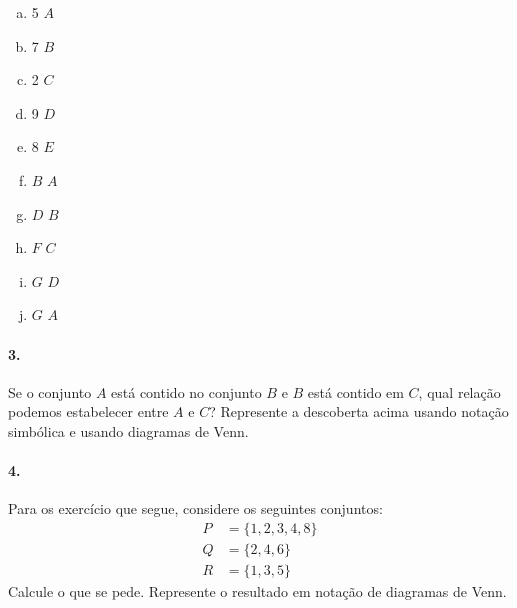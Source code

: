 \documentclass[a4paper,twocolumn,12pt]{article}
\begin{document}
\begin{minipage}[t]{0.4\columnwidth}
  
\begin{enumerate}[a)]
  \item 5 \complete $A$
  \item 7 \complete $B$
  \item 2 \complete $C$
  \item 9 \complete $D$
  \item 8 \complete $E$
  \end{enumerate}
  
\end{minipage}\hfil\begin{minipage}[t]{0.3\columnwidth}

\begin{enumerate}[a)]
  \setcounter{enumi}{5}
  \item $B$ \complete $A$
  \item $D$ \complete $B$
  \item $F$ \complete $C$
  \item $G$ \complete $D$
  \item $G$ \complete $A$
  \end{enumerate}
  
\end{minipage}

\paragraph*{3.} Se o conjunto \(A\) está contido no conjunto \(B\) e \(B\) está contido em \(C\), qual
  relação podemos estabelecer entre \(A\) e \(C\)?
 Represente a descoberta acima usando notação simbólica e usando diagramas de Venn.


\paragraph{4.} Para os exercício que segue, considere os seguintes conjuntos:
\begin{align*}
P &= \{1,2,3,4,8\}\\
Q &=  \{2,4,6\}\\
R &= \{1,3,5\}
\end{align*}
Calcule o que se pede. Represente o resultado em notação de diagramas de Venn.

\medskip
\end{document}
